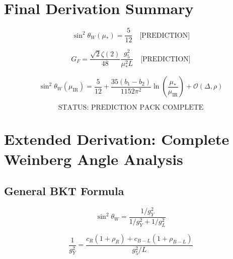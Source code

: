 \documentclass[11pt,a4paper]{article}
\theoremstyle{definition}
\begin{document}
\section{Final Derivation Summary}
\label{app:final}

\begin{equation}
\label{eq:final_sw2}
\sin^2\theta_W(\mu_*) = \frac{5}{12} \quad \text{[PREDICTION]}
\end{equation}

\begin{equation}
\label{eq:final_GF}
G_F = \frac{\sqrt{2}\zeta(2)}{48}\frac{g_5^2}{\mu_*^2 L} \quad \text{[PREDICTION]}
\end{equation}

\begin{equation}
\label{eq:final_sw2_IR}
\sin^2\theta_W(\mu_{\text{IR}}) = \frac{5}{12} + \frac{35(b_1 - b_2)}{1152\pi^2}\ln\left(\frac{\mu_*}{\mu_{\text{IR}}}\right) + \mathcal{O}(\Delta, \rho)
\end{equation}

\begin{equation}
\label{eq:final_status}
\text{STATUS: PREDICTION PACK COMPLETE}
\end{equation}

\section{Extended Derivation: Complete Weinberg Angle Analysis}
\label{app:sw2_complete}

\subsection{General BKT Formula}
\label{subsec:sw2_general}

\begin{equation}
\label{eq:sw2_gen_1}
\sin^2\theta_W = \frac{1/g_Y^2}{1/g_Y^2 + 1/g_L^2}
\end{equation}

\begin{equation}
\label{eq:sw2_gen_2}
\frac{1}{g_Y^2} = \frac{c_R(1 + \rho_R) + c_{B-L}(1 + \rho_{B-L})}{g_5^2/L}
\end{equation}
\end{document}
